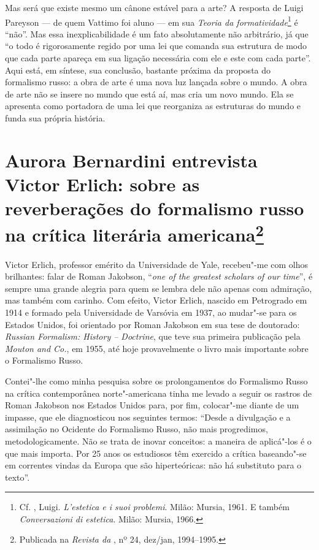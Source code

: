 Mas será que existe mesmo um cânone estável para a arte? A resposta de
Luigi Pareyson --- de quem Vattimo foi aluno
 --- em sua \emph{Teoria da formatividade}\footnote{Cf. , Luigi. 
\emph{L'estetica e i suoi problemi}. Milão: Mursia,
 1961. E também \emph{Conversazioni di estetica}. Milão: Mursia, 1966.}
 é ``não''. Mas essa inexplicabilidade é
um fato absolutamente não arbitrário, já que ``o todo é rigorosamente
regido por uma lei que comanda sua estrutura de modo que cada parte
apareça em sua ligação necessária com ele e este com cada parte''. Aqui
está, em síntese, sua conclusão, bastante próxima da proposta do
formalismo russo: a obra de arte é uma nova luz lançada sobre o mundo. A
obra de arte não se insere no mundo que está aí, mas cria um novo mundo.
Ela se apresenta como portadora de uma lei que reorganiza as estruturas
do mundo e funda sua própria história.

\chapter*{Aurora Bernardini entrevista Victor Erlich: sobre as reverberações do formalismo russo na crítica literária americana\footnote{Publicada na \emph{Revista da \protect{}}, nº 24, dez/jan, 1994--1995.}}

\label{erlich}

Victor Erlich, professor emérito da Universidade de Yale, recebeu"-me com
olhos brilhantes: falar de Roman Jakobson, ``\emph{one of the greatest
scholars of our time}'', é sempre uma grande alegria para quem se lembra
dele não apenas com admiração, mas também com carinho.
Com efeito, Victor Erlich, nascido em Petrogrado em 1914 e formado pela
Universidade de Varsóvia em 1937, ao mudar"-se para os Estados Unidos, foi
orientado por Roman Jakobson em sua tese de doutorado: \emph{Russian
Formalism: History -- Doctrine}, que teve sua primeira publicação
pela \emph{Mouton and Co.}, em 1955, até hoje provavelmente o livro
mais importante sobre o Formalismo Russo.

Contei"-lhe como minha pesquisa sobre os prolongamentos do Formalismo
Russo na crítica contemporânea norte"-americana tinha me levado
 a seguir os rastros de Roman Jakobson nos Estados Unidos para,
por fim, colocar"-me diante de um impasse, que ele diagnosticou nos seguintes
termos: ``Desde a divulgação e a assimilação no Ocidente do Formalismo
Russo, não mais progredimos, metodologicamente. Não se trata de inovar
conceitos: a maneira de aplicá"-los é o que mais importa. Por 25 anos os
estudiosos têm exercido a crítica baseando"-se em correntes vindas da
Europa que são hiperteóricas: não há substituto para o texto''.

